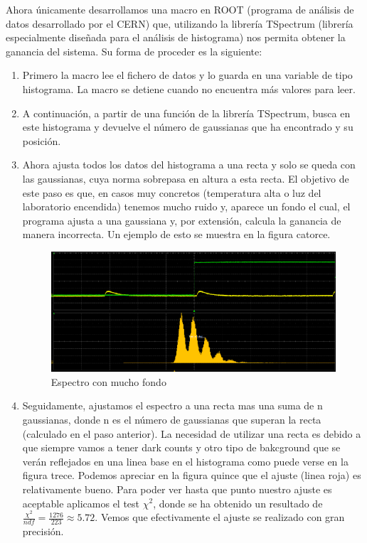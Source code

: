 Ahora únicamente desarrollamos una macro en ROOT (programa de análisis de datos desarrollado por el CERN) que, utilizando la librería TSpectrum (librería especialmente diseñada para el análisis de histograma) nos permita obtener la ganancia del sistema. Su forma de proceder es la siguiente:
\begin{enumerate}
\item {} Primero la macro lee el fichero de datos y lo guarda en una variable de tipo histograma. La macro se detiene cuando no encuentra más valores para leer.

\item {} A continuación, a partir de una función de la librería TSpectrum, busca en este histograma y devuelve el número de gaussianas que ha encontrado y su posición.

\item {} Ahora ajusta todos los datos del histograma a una recta y solo se queda con las gaussianas, cuya norma sobrepasa en altura a esta recta. El objetivo de este paso es que, en casos muy concretos (temperatura alta o luz del laboratorio encendida) tenemos mucho ruido y, aparece un fondo el cual, el programa ajusta a una gaussiana y, por extensión, calcula la ganancia de manera incorrecta. Un ejemplo de esto se muestra en la figura catorce.

\begin{figure}[hbtp]
\centering
\includegraphics[scale=0.4]{fondogaussiano.png}
\caption{Espectro con mucho fondo}
\end{figure}

\item {} Seguidamente, ajustamos el espectro a una recta mas una suma de n gaussianas, donde n es el número de gaussianas que superan la recta (calculado en el paso anterior). La necesidad de utilizar una recta es debido a que siempre vamos a tener dark counts y otro tipo de bakcground que se verán reflejados en una linea base en el histograma como puede verse en la figura trece. Podemos apreciar en la figura quince que el ajuste (linea roja) es relativamente bueno. Para poder ver hasta que punto nuestro ajuste es aceptable aplicamos el test $\chi^2$, donde se ha obtenido un resultado de $\frac{\chi^2}{ndf}=\frac{1276}{223}\approx 5.72$. Vemos que efectivamente el ajuste se realizado con gran precisión.


\end{enumerate}
